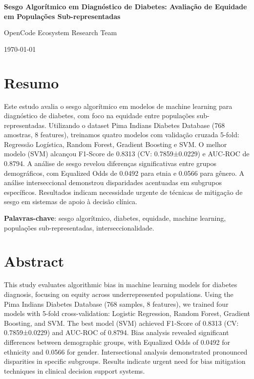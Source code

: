 \documentclass[12pt,a4paper]{article}
\begin{document}
\begin{center}
{\Large\bfseries Sesgo Algorítmico em Diagnóstico de Diabetes: 
Avaliação de Equidade em Populações Sub-representadas\vspace{0.5cm}}

{\large OpenCode Ecosystem Research Team\vspace{0.3cm}}

{\small \today}
\end{center}

\section*{Resumo}

Este estudo avalia o sesgo algorítmico em modelos de machine learning para 
diagnóstico de diabetes, com foco na equidade entre populações sub-representadas.
Utilizando o dataset Pima Indians Diabetes Database (768 amostras, 
8 features), treinamos quatro modelos com validação cruzada 5-fold: 
Regressão Logística, Random Forest, Gradient Boosting e SVM. O melhor modelo 
(SVM) alcançou F1-Score de 0.8313 (CV: 0.7859±0.0229) e AUC-ROC de 
0.8794. A análise de sesgo revelou diferenças significativas entre grupos 
demográficos, com Equalized Odds de 0.0492 para etnia e 0.0566 para gênero. 
A análise interseccional demonstrou disparidades acentuadas em subgrupos 
específicos. Resultados indicam necessidade urgente de técnicas de mitigação 
de sesgo em sistemas de apoio à decisão clínica.

\textbf{Palavras-chave}: sesgo algorítmico, diabetes, equidade, machine 
learning, populações sub-representadas, interseccionalidade.

\section*{Abstract}

This study evaluates algorithmic bias in machine learning models for diabetes 
diagnosis, focusing on equity across underrepresented populations. Using the 
Pima Indians Diabetes Database (768 samples, 8 features), we trained four 
models with 5-fold cross-validation: Logistic Regression, Random Forest, 
Gradient Boosting, and SVM. The best model (SVM) achieved F1-Score of 
0.8313 (CV: 0.7859±0.0229) and AUC-ROC of 0.8794. Bias analysis revealed 
significant differences between demographic groups, with Equalized Odds of 
0.0492 for ethnicity and 0.0566 for gender. Intersectional analysis 
demonstrated pronounced disparities in specific subgroups. Results indicate 
urgent need for bias mitigation techniques in clinical decision support 
systems.
\end{document}
